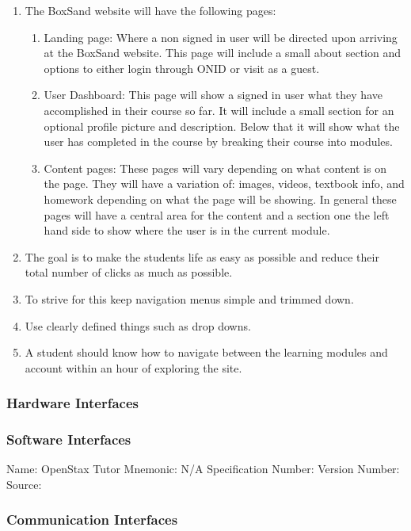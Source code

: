 \documentclass[onecolumn, draftclsnofoot,10pt, compsoc]{IEEEtran}
\begin{document}
\begin{enumerate}
\item The BoxSand website will have the following pages:
\begin{enumerate}
\item Landing page: Where a non signed in user will be directed upon arriving at the BoxSand website. This page will include a small about section and options to either login through ONID or visit as a guest. 
\item User Dashboard: This page will show a signed in user what they have accomplished in their course so far. It will include a small section for an optional profile picture and description. Below that it will show what the user has completed in the course by breaking their course into modules.
\item Content pages: These pages will vary depending on what content is on the page. They will have a variation of: images, videos, textbook info, and homework depending on what the page will be showing. In general these pages will have a central area for the content and a section one the left hand side to show where the user is in the current module. 
\end{enumerate}
\item The goal is to make the students life as easy as possible and reduce their total number of clicks as much as possible. 
\item To strive for this keep navigation menus simple and trimmed down. 
\item Use clearly defined things such as drop downs. 
\item A student should know how to navigate between the learning modules and account within an hour of exploring the site. 
\end{enumerate}

\subsubsection{Hardware Interfaces}

\subsubsection{Software Interfaces}
Name: OpenStax Tutor 
Mnemonic: N/A
Specification Number:
Version Number:
Source: 

\subsubsection{Communication Interfaces}
\end{document}

